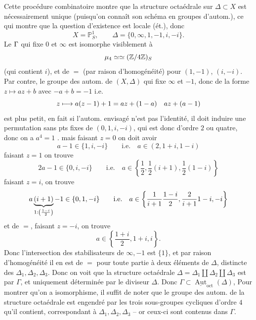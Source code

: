 Cette procédure combinatoire montre que la structure octaédrale  sur $\Delta\subset X$ est nécessairement unique (puisqu'on connaît son schéma en groupes d'autom.), ce qui montre que la question d'existence est locale (ét.), donc 
\[
X=\mathbb P^1_S,\qquad\Delta=\{0,\infty,1,-1,i,-i\}.
\]
Le   $\Gamma$ qui fixe $0$ et $\infty$ est isomorphe visiblement à
\[
\mu_4\simeq\simeq(\mathbb Z/4\mathbb Z)_S
\]
(qui contient $i$),  et de $=$ (par raison d'homogénéité) pour $(1,-1)$, $(i,-i)$. Par contre, le
groupe des autom. de $(X,\Delta)$ qui fixe $\infty$ et $-1$, donc  de la forme $z\longmapsto az+b$ avec $-a+b=-1$ i.e.
\[
z\longmapsto a(z-1)+1=az+(1-a)\quad az+(a-1)
\]
est plus petit, en fait si l'autom. envisagé n'est pas l'identité, il doit induire une permutation sans pts fixes de $(0,1,i,-i)$, qui est donc d'ordre $2$ ou quatre, donc on a $a^4=1$ .
mais faisant $z=0$ on doit avoir
\[
a-1\in\{1,i,-i\}\qquad\text{i.e.}\quad a\in(2,1+i,1-i)
\]
faisant $z=1$ on trouve
\[
2a-1\in\{0,i,-i\}\qquad\text{i.e.}\quad a\in\left\{\frac12,\frac12(i+1),\frac12(1-i)\right\}
\]
faisant $z=i$, on trouve
\[
a\underbrace{(i+1)}_{1:\left(\frac{1-i}{2}\right)}-1\in\{0,1,-i\}
\qquad\text{i.e.}\quad
 a\in\left\{\frac1{i+1}\frac{1-i}{2},\frac2{i+1}1-i,-i\right\}
\]
et de $=$, faisant $z=-i$, on trouve
\[
a\in\left\{\frac{1+i}{2},1+i,i\right\}.
\]
Donc l'intersection des stabilisateurs de $\infty,-1$ est $\{1\}$, et par raison d'homogénéité il en est de $=$ pour toute partie à deux éléments de $\Delta$, distincte des $\Delta_1,\Delta_2,\Delta_3$. Donc on voit que la structure octaédrale $\Delta=\Delta_1\amalg\Delta_2\amalg\Delta_3$ est  par $\Gamma$, et uniquement déterminée par le diviseur $\Delta$. Donc $\Gamma\subset\underline{\operatorname{Aut}}_{\mathrm{oct}}(\Delta)$, Pour montrer qu'on a isomorphisme, il suffit de noter que le groupe des autom.  de la structure octaédrale est engendré par les trois sous-groupes cycliques d'ordre $4$  qu'il contient, correspondant à $\Delta_1,\Delta_2,\Delta_3$ -- or ceux-ci sont contenus dans $\Gamma$.
